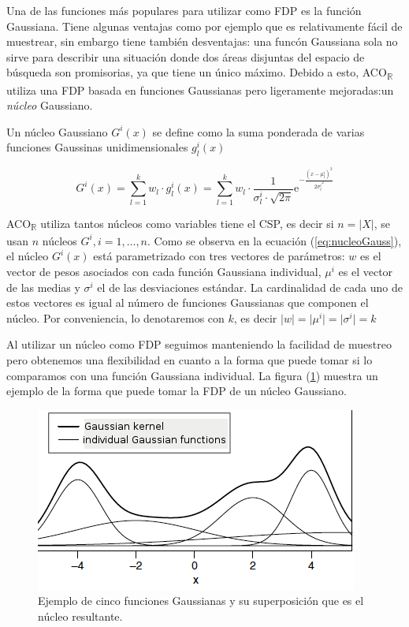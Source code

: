 \documentclass{llncs}
\begin{document}
	Una de las funciones más populares para utilizar como FDP es la función Gaussiana. Tiene algunas ventajas como por ejemplo que es relativamente fácil de muestrear, sin embargo tiene también desventajas: una funcón Gaussiana sola no sirve para describir una situación donde dos áreas disjuntas del espacio de búsqueda son promisorias, ya que tiene un único máximo. Debido a esto, ACO\textsubscript{$\mathbb{R}$} utiliza una FDP basada en funciones Gaussianas pero ligeramente mejoradas:un \textit{núcleo} Gaussiano.
	
	Un núcleo Gaussiano $G^i(x)$ se define como la suma ponderada de varias funciones Gaussinas unidimensionales $g^i_l(x)$
	
	\begin{equation}
	\label{eq:nucleoGauss}
	G^i(x) = \sum_{l=1}^{k}w_l \cdot g_l^i(x) = \sum_{l=1}^{k}w_l \cdot \frac{1}{\sigma_l^i \cdot \sqrt{2\pi}}\textrm{e}^{-\frac{(x - \mu^i_l)^2}{2{\sigma^i_l}^2}}
	\end{equation}

	ACO\textsubscript{$\mathbb{R}$} utiliza tantos núcleos como variables tiene el CSP, es decir si $n = \vert X \vert$, se usan $n$ núcleos $G^i, i = 1, \dots, n$. Como se observa en la ecuación (\ref{eq:nucleoGauss}), el núcleo $G^i(x)$ está parametrizado con tres vectores de parámetros: $w$ es el vector de pesos asociados con cada función Gaussiana individual, $\mu^i$ es el vector de las medias y $\sigma^i$ el de las desviaciones estándar. La cardinalidad de cada uno de estos vectores es igual al número de funciones Gaussianas que componen el núcleo. Por conveniencia, lo denotaremos con $k$, es decir $\vert w \vert = \vert \mu^i \vert = \vert \sigma^i \vert = k$
	
	Al utilizar un núcleo como FDP seguimos manteniendo la facilidad de muestreo pero obtenemos una flexibilidad en cuanto a la forma que puede tomar si lo comparamos con una función Gaussiana individual. La figura (\ref{fig:gaussianKernel}) muestra un ejemplo de la forma que puede tomar la FDP de un núcleo Gaussiano. 
	
	\begin{figure}[H]
		\centering
		\includegraphics[scale=0.5]{gaussianKernel.png}
		\caption{Ejemplo de cinco funciones Gaussianas y su superposición que es el núcleo resultante.}
		\label{fig:gaussianKernel}
	\end{figure}
\end{document}
